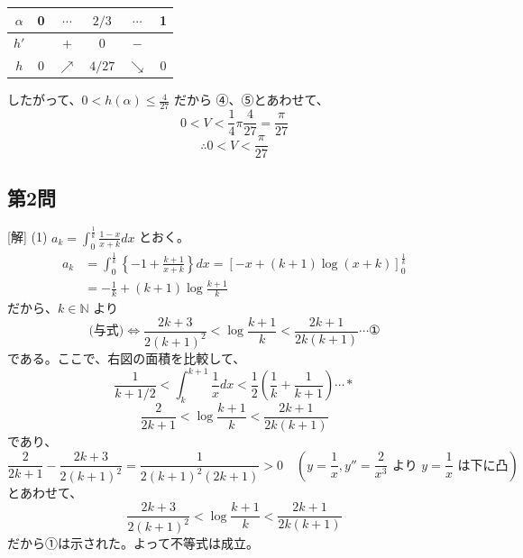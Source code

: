 \documentclass[../main.tex]{subfiles}
\begin{document}
\begin{center}
  \begin{tabular}{|c|c|c|c|c|c|}
    \hline
    $\alpha$ & 0 & $\cdots$ & $2/3$ & $\cdots$ & 1 \\
    \hline
    $h'$ & & $+$ & 0 & $-$ & \\
    \hline
    $h$ & 0 & $\nearrow$ & $4/27$ & $\searrow$ & 0 \\
    \hline
  \end{tabular}
\end{center}

したがって、$0 < h(\alpha) \le \frac{4}{27}$ だから ④、⑤とあわせて、
\[ 0 < V < \frac{1}{4}\pi \frac{4}{27} = \frac{\pi}{27} \]
\[ \therefore 0 < V < \frac{\pi}{27} \]

\begin{center}
\end{center}

\subsection*{第2問}
[解] (1) $a_k = \int_{0}^{\frac{1}{k}} \frac{1-x}{x+k} dx$ とおく。
\begin{align*}
  a_k &= \int_{0}^{\frac{1}{k}} \left\{ -1 + \frac{k+1}{x+k} \right\} dx = \left[ -x + (k+1)\log(x+k) \right]_{0}^{\frac{1}{k}} \\
  &= -\frac{1}{k} + (k+1)\log\frac{k+1}{k}
\end{align*}
だから、$k \in \mathbb{N}$ より
\[ \text{(与式)} \Leftrightarrow \frac{2k+3}{2(k+1)^2} < \log\frac{k+1}{k} < \frac{2k+1}{2k(k+1)} \cdots \text{①} \]
である。ここで、右図の面積を比較して、
\[ \frac{1}{k+1/2} < \int_{k}^{k+1} \frac{1}{x} dx < \frac{1}{2}\left(\frac{1}{k} + \frac{1}{k+1}\right) \cdots * \]
\[ \frac{2}{2k+1} < \log\frac{k+1}{k} < \frac{2k+1}{2k(k+1)} \]
であり、
\[ \frac{2}{2k+1} - \frac{2k+3}{2(k+1)^2} = \frac{1}{2(k+1)^2(2k+1)} > 0 \quad \left( y = \frac{1}{x}, y'' = \frac{2}{x^3} \text{ より } y = \frac{1}{x} \text{ は下に凸} \right) \]
とあわせて、
\[ \frac{2k+3}{2(k+1)^2} < \log\frac{k+1}{k} < \frac{2k+1}{2k(k+1)} \]
だから①は示された。よって不等式は成立。
\end{document}
